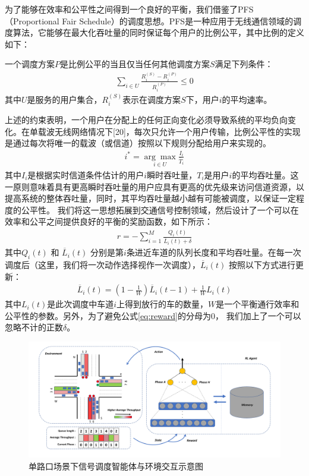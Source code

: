为了能够在效率和公平性之间得到一个良好的平衡，我们借鉴了PFS（Proportional Fair Schedule）的调度思想。PFS是一种应用于无线通信领域的调度算法，它能够在最大化吞吐量的同时保证每个用户的比例公平，其中比例的定义如下：
\begin{definition}[比例公平]
\label{def:PFS}
一个调度方案$P$是比例公平的当且仅当任何其他调度方案$S$满足下列条件：
\begin{align}
    \sum_{i \in U} \frac{R_{i}^{(S)}-R_{i}^{(P)}}{R_{i}^{(P)}} \leq 0
\end{align}
其中$U$是服务的用户集合，$R_i^{(S)}$表示在调度方案$S$下，用户$i$的平均速率。
\end{definition}
上述的约束表明，一个用户在分配上的任何正向变化必须导致系统的平均负向变化。在单载波无线网络情况下[20]，每次只允许一个用户传输，比例公平性的实现是通过每次将唯一的载波（或信道）按照以下规则分配给用户来实现的。
\begin{align}
    i^*=\underset{i\in U}{\arg \max } \frac{I_{i}}{\bar{T}_{i}}
\end{align}
其中$I_i$是根据实时信道条件估计的用户$i$瞬时吞吐量，$T_i$是用户$i$的平均吞吐量。这一原则意味着具有更高瞬时吞吐量的用户应具有更高的优先级来访问信道资源，以提高系统的整体吞吐量，同时，其平均吞吐量越小越有可能被调度，以保证一定程度的公平性。
我们将这一思想拓展到交通信号控制领域，然后设计了一个可以在效率和公平之间提供良好的平衡的奖励函数，如下所示：
\begin{align}
\label{eq:reward}
    r = -\sum_{i=1}^{M} \frac{Q_i(t)}{\overline{L}_i(t) + \delta}
\end{align}
其中$Q_i(t)$ 和 $\overline{L}_i(t)$ 分别是第$i$条进近车道的队列长度和平均吞吐量。在每一次调度后（这里，我们将一次动作选择视作一次调度），$\overline{L}_i(t)$ 按照以下方式进行更新：
\begin{align}
    \label{eq:li-update}
    \overline{L}_i(t) = (1-\frac{1}{W})\overline{L}_i(t-1) + \frac{1}{W}L_i(t)
\end{align}
其中$L_i(t)$是此次调度中车道$i$上得到放行的车的数量，$W$是一个平衡通行效率和公平性的参数。另外，为了避免公式\ref{eq:reward}的分母为0， 我们加上了一个可以忽略不计的正数$\delta$。

\begin{figure}[htb]
  \includegraphics[width=1.0\textwidth]{fig/sysmodel.pdf}
  \caption{单路口场景下信号调度智能体与环境交互示意图}
  \label{fig:system-model}
\end{figure}

